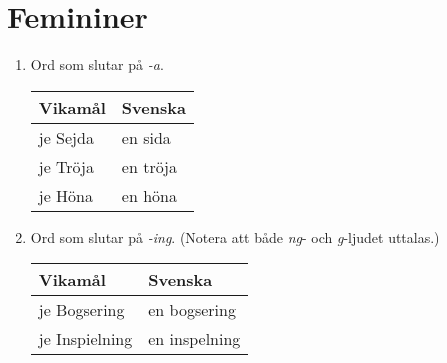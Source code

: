 \documentclass[a4paper]{memoir}
\newcommand{\eline}{\\[\baselineskip]} %
\newenvironment{mytable}[2]
{
  \eline
  \begin{tabular}{#1}
  \hline #2\\ \hline
}
{ \end{tabular} }
\newcommand{\myheader}[1]{ \hline #1\\ \hline }
\newenvironment{wlistvisv} %
{ \begin{mytable}{ l l }{Vikamål & Svenska} }
{ \end{mytable} }
\newenvironment{rlist} %
{ \begin{enumerate}[label=\Alph*] }
{ \end{enumerate} }
\begin{document}
    \section{Femininer}
      \begin{rlist}
        \item Ord som slutar på \emph{-a}.
        \begin{wlistvisv}
          je Sejda & en sida\\
          je Tröja & en tröja\\
          je Höna & en höna\\
        \end{wlistvisv}
        \item Ord som slutar på \emph{-ing}. (Notera att både \emph{ng}- och \emph{g}-ljudet uttalas.)
        \begin{wlistvisv}
          je Bogsering & en bogsering\\
          je Inspielning & en inspelning\\
        \end{wlistvisv}
      \end{rlist}
\end{document}
